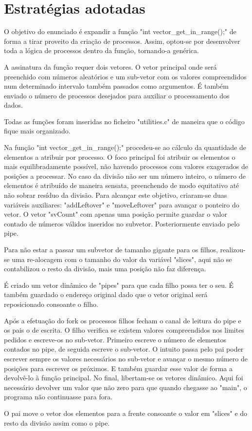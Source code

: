\documentclass[11pt,a4paper]{report}
\begin{document}
    \section{Estratégias adotadas}
        O objetivo do enunciado é expandir a função "int vector\_get\_in\_range();" de forma a tirar proveito da criação de processos. Assim, optou-se por desenvolver toda a
        lógica de processos dentro da função, tornando-a genérica.

        A assinatura da função requer dois vetores. O vetor principal onde será preenchido com números aleatórios e um sub-vetor com os valores compreendidos num
        determinado intervalo também passados como argumentos. É também enviado o número de processos desejados para auxiliar o processamento dos dados.

        Todas as funções foram inseridas no ficheiro "utilities.c" de maneira que o código fique mais organizado.

        Na função "int vector\_get\_in\_range();" procedeu-se ao cálculo da quantidade de elementos a atribuir por processo.
        O foco principal foi atribuir os elementos o
        mais equilibradamente possível, não havendo processos com valores exagerados de posições a processar. No caso da divisão não ser um número inteiro, o número de
        elementos é atribuído de maneira sensata, preenchendo de modo equitativo até não sobrar resíduo da divisão. Para alcançar este objetivo, criaram-se duas
        variáveis auxiliares: "addLeftover" e "moveLeftover" para avançar o ponteiro do vetor.
        O vetor "svCount" com apenas uma posição permite guardar o valor contado de números válidos inseridos no subvetor. Posteriormente enviado pelo pipe.

        Para não estar a passar um subvetor de tamanho gigante para os filhos, realizou-se uma re-alocagem com o tamanho do valor da variável "slices", aqui não se
        contabilizou o resto da divisão, mais uma posição não faz diferença.

        É criado um vetor dinâmico de "pipes" para que cada filho possa ter o seu. É também guardado o endereço original dado que o vetor original será
        reposicionado consoante o filho.

        Após a efetuação do fork os processos filhos fecham o canal de leitura do pipe e os pais o de escrita.
        O filho verifica se existem valores compreendidos nos limites pedidos e escreve-os no sub-vetor. Primeiro escreve o número de elementos contados no pipe, de
        seguida escreve o sub-vetor. O intuito passa pelo pai poder escrever sempre os valores necessários no sub-vetor e avançar o mesmo número de posições para
        escrever os próximos. E também guardar esse valor de forma a devolvê-lo à função principal. No final, libertam-se os vetores dinâmico.
        Aqui foi necessário devolver um valor que não zero para que quando chegasse ao "main", o programa não continuasse para fora.

        O pai move o vetor dos elementos para a frente consoante o valor em "slices" e do resto da divisão assim como o pipe.
\end{document}
